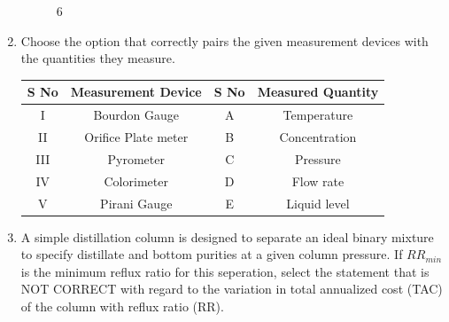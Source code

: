 \documentclass[journal]{IEEEtran}
\numberwithin{equation}{enumi}
\numberwithin{figure}{enumi}
\begin{document}
\begin{enumerate}[start=1, label={Q\arabic*.}]
\begin{figure}[H]
    \caption{6}
    \label{fig:6}
\end{figure}
\begin{enumerate} 
  \end{enumerate}
\item Choose the option that correctly pairs the given measurement devices with the quantities they measure.
\begin{center}
\begin{tabular}{c c c c}
\hline
\textbf{S No} & \textbf{Measurement Device} & \textbf{S No} & \textbf{Measured Quantity} \\
\hline
I   & Bourdon Gauge       & A & Temperature   \\
II  & Orifice Plate meter & B & Concentration \\
III & Pyrometer           & C & Pressure      \\
IV  & Colorimeter         & D & Flow rate     \\
\hline
V   & Pirani Gauge        & E & Liquid level  \\
\hline
\end{tabular}
\end{center}
\begin{enumerate} 
  \end{enumerate}
\item A simple distillation column is designed to separate an ideal binary mixture to specify distillate and bottom purities at a given column pressure. If $RR_{min}$ is the minimum reflux ratio for this seperation, select the statement that is NOT CORRECT with regard to the variation in total annualized cost (TAC) of the column with reflux ratio (RR).

\end{enumerate}
\end{document}
